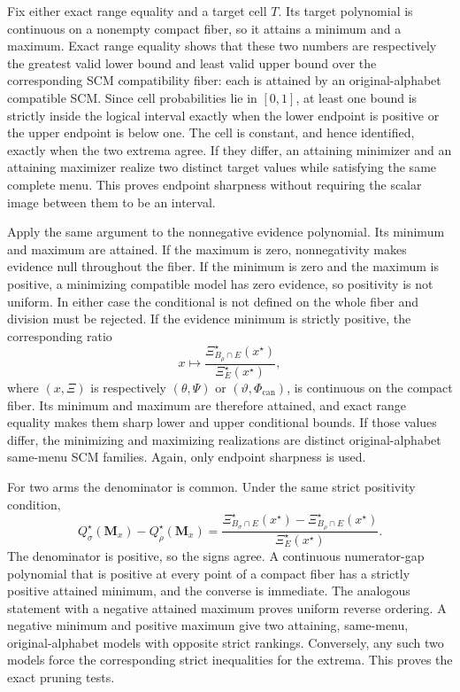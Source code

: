 Fix either exact range equality and a target cell \(T\). Its target polynomial is continuous on a nonempty compact fiber, so it attains a minimum and a maximum. Exact range equality shows that these two numbers are respectively the greatest valid lower bound and least valid upper bound over the corresponding SCM compatibility fiber: each is attained by an original-alphabet compatible SCM. Since cell probabilities lie in \([0,1]\), at least one bound is strictly inside the logical interval exactly when the lower endpoint is positive or the upper endpoint is below one. The cell is constant, and hence identified, exactly when the two extrema agree. If they differ, an attaining minimizer and an attaining maximizer realize two distinct target values while satisfying the same complete menu. This proves endpoint sharpness without requiring the scalar image between them to be an interval.

Apply the same argument to the nonnegative evidence polynomial. Its minimum and maximum are attained. If the maximum is zero, nonnegativity makes evidence null throughout the fiber. If the minimum is zero and the maximum is positive, a minimizing compatible model has zero evidence, so positivity is not uniform. In either case the conditional is not defined on the whole fiber and division must be rejected. If the evidence minimum is strictly positive, the corresponding ratio
\[
x\longmapsto
\frac{\Xi_{B_\rho\cap E}^\star(x^\star)}
{\Xi_E^\star(x^\star)},
\]
where \((x,\Xi)\) is respectively \((\theta,\Psi)\) or \((\vartheta,\Phi_{\mathrm{can}})\), is continuous on the compact fiber. Its minimum and maximum are therefore attained, and exact range equality makes them sharp lower and upper conditional bounds. If those values differ, the minimizing and maximizing realizations are distinct original-alphabet same-menu SCM families. Again, only endpoint sharpness is used.

For two arms the denominator is common. Under the same strict positivity condition,
\[
Q_\sigma^\star(\mathbf M_x)-Q_\rho^\star(\mathbf M_x)
=\frac{\Xi_{B_\sigma\cap E}^\star(x^\star)
-\Xi_{B_\rho\cap E}^\star(x^\star)}
{\Xi_E^\star(x^\star)}.
\]
The denominator is positive, so the signs agree. A continuous numerator-gap polynomial that is positive at every point of a compact fiber has a strictly positive attained minimum, and the converse is immediate. The analogous statement with a negative attained maximum proves uniform reverse ordering. A negative minimum and positive maximum give two attaining, same-menu, original-alphabet models with opposite strict rankings. Conversely, any such two models force the corresponding strict inequalities for the extrema. This proves the exact pruning tests.

